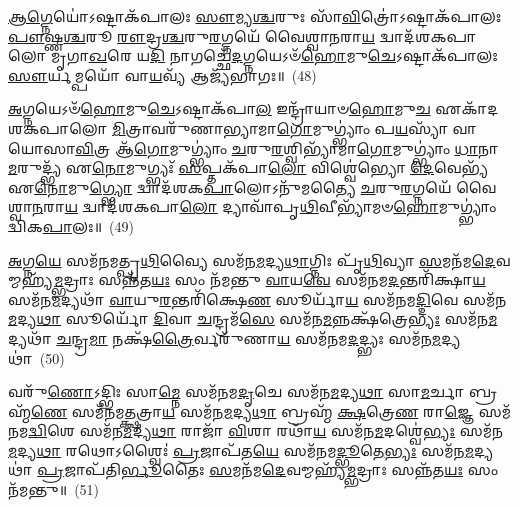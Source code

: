 {\anuvakamend[{𑌜\-\ul{𑌜𑍍𑌞𑌿} 𑌬𑍀\-\ul{𑌜}\-𑌮𑍇𑌕᳴𑌤𑍍𑌰𑌿𑍞𑌶𑌤𑍍}]}%

\-\ul{𑌆}\-\-\ul{𑌗𑍍𑌨𑍇}\-𑌯𑍋॑\-𑌽𑌷𑍍𑌟𑌾𑌕᳴𑌪𑌾𑌲𑌃 \ul{𑌸𑍗}\-𑌮𑍍𑌯\-\ul{𑌶𑍍𑌚}\-𑌰𑍁𑌃 𑌸𑌾᳴\-\ul{𑌵𑌿}\-𑌤𑍍𑌰𑍋॑\-𑌽𑌷𑍍𑌟𑌾𑌕᳴𑌪𑌾𑌲𑌃 \ul{𑌪𑍗}\-𑌷𑍍𑌣\-\ul{𑌶𑍍𑌚}\-𑌰𑍂 \ul{𑌰𑍗}\-𑌦𑍍𑌰\-\ul{𑌶𑍍𑌚}\-𑌰𑍁\-\ul{𑌰}\-𑌗𑍍𑌨𑌯𑍇᳴ 𑌵𑍈𑌶𑍍𑌵𑌾\-\ul{𑌨}\-𑌰𑌾\-\ul{𑌯} 𑌦𑍍𑌵𑌾𑌦᳴𑌶\-𑌕𑌪𑌾𑌲𑍋 𑌮𑍃𑌗𑌾\-\ul{𑌖}\-𑌰𑍇 𑌯\-\ul{𑌦𑌿} 𑌨𑌾𑌗𑌚𑍍𑌛𑍇᳴\-\ul{𑌦}\-𑌗𑍍𑌨𑌯𑍇\-𑌽𑍞᳴\-\ul{𑌹𑍋}\-𑌮𑍁\-\ul{𑌚𑍇}\-\-𑌽𑌷𑍍𑌟𑌾𑌕᳴𑌪𑌾𑌲𑌃 \ul{𑌸𑍗}\-𑌰𑍍𑌯𑌮𑍍𑌪𑌯𑍋᳴ 𑌵𑌾\-\ul{𑌯}\-𑌵𑍍𑌯᳴ 𑌆𑌜𑍍𑌯᳴𑌭𑌾𑌗𑌃॥~(48)

{\anuvakamend[{\-\ul{𑌆}\-\-\ul{𑌗𑍍𑌨𑍇}\-𑌯𑌶𑍍𑌚𑌤𑍁᳴𑌰𑍍𑌵𑌿𑍞𑌶𑌤𑌿𑌃}]}%

\-\ul{𑌅}\-𑌗𑍍𑌨𑌯𑍇\-𑌽𑍞᳴\-\ul{𑌹𑍋}\-𑌮𑍁\-\ul{𑌚𑍇}\-\-𑌽𑌷𑍍𑌟𑌾𑌕᳴𑌪𑌾\-\ul{𑌲} 𑌇𑌨𑍍𑌦𑍍𑌰𑌾᳴𑌯𑌾𑍞\-\ul{𑌹𑍋}\-𑌮𑍁\-\ul{𑌚} 𑌏𑌕𑌾᳴\-𑌦𑌶\-𑌕𑌪𑌾𑌲𑍋 \ul{𑌮𑌿}\-𑌤𑍍𑌰𑌾𑌵𑌰𑍁᳴𑌣𑌾𑌭𑍍𑌯𑌾𑌮𑌾\-\ul{𑌗𑍋}\-𑌮𑍁𑌗𑍍\-𑌭𑍍𑌯𑌾𑌂॑ 𑌪\-\ul{𑌯}\-𑌸𑍍𑌯𑌾᳴ 𑌵𑌾𑌯𑍋𑌸𑌾\-\ul{𑌵𑌿}\-𑌤𑍍𑌰 𑌆᳴\-\ul{𑌗𑍋}\-𑌮𑍁𑌗𑍍\-𑌭𑍍𑌯𑌾𑌂॑ \ul{𑌚}\-𑌰𑍁\-\ul{𑌰}\-𑌶𑍍𑌵𑌿𑌭𑍍𑌯𑌾᳴𑌮𑌾\-\ul{𑌗𑍋}\-𑌮𑍁𑌗𑍍\-𑌭𑍍𑌯𑌾𑌂॑ \ul{𑌧𑌾}\-𑌨𑌾 \ul{𑌮}\-𑌰𑍁𑌦𑍍𑌭𑍍𑌯᳴ 𑌏\-\ul{𑌨𑍋}\-𑌮𑍁𑌗𑍍𑌭𑍍𑌯𑌃᳴ \ul{𑌸}\-𑌪𑍍𑌤𑌕᳴𑌪𑌾\-\ul{𑌲𑍋} 𑌵𑌿𑌶𑍍𑌵𑍇॑𑌭𑍍𑌯𑍋 \ul{𑌦𑍇}\-𑌵𑍇𑌭𑍍𑌯᳴ 𑌏\-\ul{𑌨𑍋}\-𑌮𑍁\-\ul{𑌗𑍍𑌭𑍍𑌯𑍋} 𑌦𑍍𑌵𑌾𑌦᳴𑌶\-𑌕\-\ul{𑌪𑌾}\-𑌲𑍋\-𑌽𑌨𑍁᳴𑌮𑌤𑍍𑌯𑍈 \ul{𑌚}\-𑌰𑍁\-\ul{𑌰}\-𑌗𑍍𑌨𑌯𑍇᳴ 𑌵𑍈𑌶𑍍𑌵𑌾\-\ul{𑌨}\-𑌰𑌾\-\ul{𑌯} 𑌦𑍍𑌵𑌾𑌦᳴𑌶\-𑌕𑌪𑌾\-\ul{𑌲𑍋} 𑌦𑍍𑌯𑌾𑌵𑌾᳴𑌪𑍃\-\ul{𑌥𑌿}\-𑌵𑍀𑌭𑍍𑌯𑌾᳴𑌮𑍞\-\ul{𑌹𑍋}\-𑌮𑍁𑌗𑍍\-𑌭𑍍𑌯𑌾𑌂॑ 𑌦𑍍𑌵𑌿𑌕\-\ul{𑌪𑌾}\-𑌲𑌃॥~(49)

{\anuvakamend[{\-\ul{𑌅}\-𑌗𑍍𑌨𑌯𑍇\-𑌽𑍞᳴\-\ul{𑌹𑍋}\-𑌮𑍁𑌚𑍇॑ \ul{𑌤𑍍𑌰𑌿}\-\-\ul{𑍞}\-𑌶𑌤𑍍}]}%

\-\ul{𑌅}\-𑌗𑍍𑌨\-\ul{𑌯𑍇} 𑌸𑌮᳴𑌨𑌮𑌤𑍍𑌪𑍃\-\ul{𑌥𑌿}\-𑌵𑍍𑌯𑍈 𑌸𑌮᳴𑌨\-\ul{𑌮}\-𑌦𑍍𑌯\-\ul{𑌥𑌾}\-𑌗𑍍𑌨𑌿𑌃 𑌪𑍃᳴\-\ul{𑌥𑌿}\-𑌵𑍍𑌯𑌾 \ul{𑌸}\-𑌮𑌨᳴𑌮\-\ul{𑌦𑍇}\-𑌵𑌮𑍍𑌮𑌹𑍍𑌯᳴\-\ul{𑌮𑍍𑌭}\-𑌦𑍍𑌰𑌾𑌃 𑌸𑌨𑍍𑌨᳴𑌤\-\ul{𑌯𑌃} 𑌸𑌂 𑌨᳴𑌮𑌨𑍍𑌤𑍁 \ul{𑌵𑌾}\-𑌯\-\ul{𑌵𑍇} 𑌸𑌮᳴𑌨𑌮\-\ul{𑌦}\-𑌨𑍍𑌤𑌰𑌿᳴𑌕𑍍𑌷𑌾\-\ul{𑌯} 𑌸𑌮᳴𑌨\-\ul{𑌮}\-𑌦𑍍𑌯𑌥𑌾᳴ \ul{𑌵𑌾}\-𑌯𑍁\-\ul{𑌰}\-𑌨𑍍𑌤𑌰𑌿᳴𑌕𑍍𑌷𑍇\-\ul{𑌣} 𑌸𑍂𑌰𑍍𑌯𑌾᳴\-\ul{𑌯} 𑌸𑌮᳴𑌨𑌮\-\ul{𑌦𑍍𑌦𑌿}\-𑌵𑍇 𑌸𑌮᳴𑌨\-\ul{𑌮}\-𑌦𑍍𑌯\-\ul{𑌥𑌾} 𑌸𑍂𑌰𑍍𑌯𑍋᳴ \ul{𑌦𑌿}\-𑌵𑌾 \ul{𑌚}\-𑌨𑍍𑌦𑍍𑌰𑌮᳴\-\ul{𑌸𑍇} 𑌸𑌮᳴𑌨\-\ul{𑌮}\-𑌨𑍍𑌨𑌕𑍍𑌷᳴𑌤𑍍𑌰𑍇\-\ul{𑌭𑍍𑌯𑌃} 𑌸𑌮᳴𑌨\-\ul{𑌮}\-𑌦𑍍𑌯𑌥𑌾᳴ \ul{𑌚}\-𑌨𑍍𑌦𑍍𑌰\-\ul{𑌮𑌾} 𑌨𑌕𑍍𑌷᳴\-\ul{𑌤𑍍𑌰𑍈}\-𑌰𑍍𑌵𑌰𑍁᳴𑌣𑌾\-\ul{𑌯} 𑌸𑌮᳴𑌨𑌮\-\ul{𑌦}\-𑌦𑍍𑌭𑍍𑌯𑌃 𑌸𑌮᳴𑌨\-\ul{𑌮}\-𑌦𑍍𑌯𑌥𑌾॑~(50)

𑌵𑌰𑍁᳴\-\ul{𑌣𑍋}\-\-𑌽𑌦𑍍𑌭𑌿𑌃 𑌸𑌾\-\ul{𑌮𑍍𑌨𑍇} 𑌸𑌮᳴𑌨𑌮\-\ul{𑌦𑍃}\-𑌚𑍇 𑌸𑌮᳴𑌨\-\ul{𑌮}\-𑌦𑍍𑌯\-\ul{𑌥𑌾} 𑌸𑌾\-\ul{𑌮}\-𑌰𑍍𑌚𑌾 𑌬𑍍𑌰𑌹𑍍𑌮᳴\-\ul{𑌣𑍇} 𑌸𑌮᳴𑌨𑌮\-\ul{𑌤𑍍𑌕𑍍𑌷}\-𑌤𑍍𑌰𑌾\-\ul{𑌯} 𑌸𑌮᳴𑌨\-\ul{𑌮}\-𑌦𑍍𑌯\-\ul{𑌥𑌾} 𑌬𑍍𑌰𑌹𑍍𑌮᳴ \ul{𑌕𑍍𑌷}\-𑌤𑍍𑌰𑍇\-\ul{𑌣} 𑌰𑌾\-\ul{𑌜𑍍𑌞𑍇} 𑌸𑌮᳴𑌨𑌮\-\ul{𑌦𑍍𑌵𑌿}\-𑌶𑍇 𑌸𑌮᳴𑌨\-\ul{𑌮}\-𑌦𑍍𑌯\-\ul{𑌥𑌾} 𑌰𑌾𑌜𑌾᳴ \ul{𑌵𑌿}\-𑌶𑌾 𑌰𑌥𑌾᳴\-\ul{𑌯} 𑌸𑌮᳴𑌨\-\ul{𑌮}\-𑌦𑌶𑍍𑌵𑍇॑\-\ul{𑌭𑍍𑌯𑌃} 𑌸𑌮᳴𑌨\-\ul{𑌮}\-𑌦𑍍𑌯\-\ul{𑌥𑌾} 𑌰𑌥𑍋\-𑌽𑌶𑍍𑌵𑍈𑌃॑ \ul{𑌪𑍍𑌰}\-𑌜𑌾𑌪᳴𑌤\-\ul{𑌯𑍇} 𑌸𑌮᳴𑌨𑌮\-\ul{𑌦𑍍𑌭𑍂}\-𑌤𑍇\-\ul{𑌭𑍍𑌯𑌃} 𑌸𑌮᳴𑌨\-\ul{𑌮}\-𑌦𑍍𑌯𑌥𑌾॑ \ul{𑌪𑍍𑌰}\-𑌜𑌾𑌪᳴𑌤𑌿\-\ul{𑌰𑍍𑌭𑍂}\-𑌤𑍈𑌃 \ul{𑌸}\-𑌮𑌨᳴𑌮\-\ul{𑌦𑍇}\-𑌵𑌮𑍍𑌮𑌹𑍍𑌯᳴\-\ul{𑌮𑍍𑌭}\-𑌦𑍍𑌰𑌾𑌃 𑌸𑌨𑍍𑌨᳴𑌤\-\ul{𑌯𑌃} 𑌸𑌂 𑌨᳴𑌮𑌨𑍍𑌤𑍁॥~(51)

